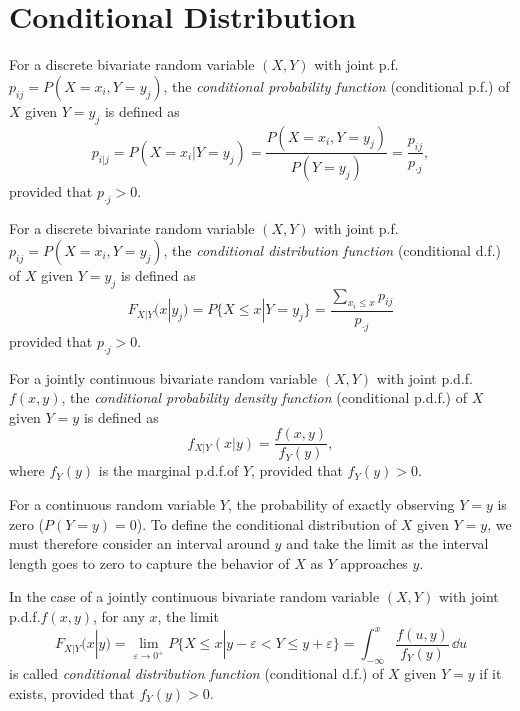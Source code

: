 \section{Conditional Distribution}

\begin{definition}
  For a discrete bivariate random variable \((X, Y)\) with joint p.f.\@ \(p_{ij} = P(X = x_i, Y = y_j)\), the \emph{conditional probability function} (conditional p.f.\@) of \(X\) given \(Y = y_j\) is defined as
  \[
    p_{i|j} = P(X = x_i | Y = y_j) = \frac{P(X = x_i, Y = y_j)}{P(Y = y_j)} = \frac{p_{ij}}{p_{\cdot j}},
  \]
  provided that \(p_{\cdot j} > 0\).
\end{definition}

\begin{definition}
  For a discrete bivariate random variable \((X, Y)\) with joint p.f.\@ \(p_{ij} = P(X = x_i, Y = y_j)\), the \emph{conditional distribution function} (conditional d.f.\@) of \(X\) given \(Y = y_j\) is defined as
  \[
    F_{X | Y}(x | y_j) = P\{X \leq x | Y = y_j\} = \frac{\sum_{x_i \leq x} p_{ij}}{p_{\cdot j}}
  \]
  provided that \(p_{\cdot j} > 0\).
\end{definition}

\begin{definition}
  For a jointly continuous bivariate random variable \((X, Y)\) with joint p.d.f.\@ \(f(x, y)\), the \emph{conditional probability density function} (conditional p.d.f.\@) of \(X\) given \(Y = y\) is defined as
  \[
    f_{X|Y}(x | y) = \frac{f(x, y)}{f_Y(y)},
  \]
  where \(f_Y(y)\) is the marginal p.d.f.\@ of \(Y\), provided that \(f_Y(y) > 0\).
\end{definition}

For a continuous random variable $Y$, the probability of exactly observing $Y = y$ is zero ($P(Y=y) = 0$). To define the conditional distribution of $X$ given $Y=y$, we must therefore consider an interval around $y$ and take the limit as the interval length goes to zero to capture the behavior of $X$ as $Y$ approaches $y$.

\begin{definition}
  In the case of a jointly continuous bivariate random variable \((X, Y)\) with joint p.d.f.\@ \(f(x, y)\), for any \(x\), the limit
  \[
    F_{X | Y}(x | y) = \lim_{\varepsilon \to 0^+} P\{X \leq x | y - \varepsilon < Y \leq y + \varepsilon\} = \int_{-\infty}^{x} \frac{f(u, y)}{f_Y(y)} \, \dd u
  \]
  is called \emph{conditional distribution function} (conditional d.f.\@) of \(X\) given \(Y = y\) if it exists, provided that \(f_Y(y) > 0\).
\end{definition}

